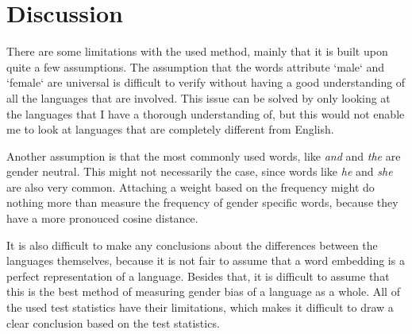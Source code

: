 \section{Discussion}
%
There are some limitations with the used method, mainly that it is built upon quite a few
assumptions.
The assumption that the words attribute `male` and `female` are universal is difficult
to verify without having a good understanding of all the languages that are involved.
This issue can be solved by only looking at the languages that I have a thorough
understanding of, but this would not enable me to look at languages that are completely
different from English.

Another assumption is that the most commonly used words, like \textit{and} and \textit{the}
are gender neutral. This might not necessarily the case, since words like \textit{he} and
\textit{she} are also very common. Attaching a weight based on the frequency might do
nothing more than measure the frequency of gender specific words, because they have a
more pronouced cosine distance.

It is also difficult to make any conclusions about the differences between the languages
themselves, because it is not fair to assume that a word embedding is a perfect
representation of a language. Besides that, it is difficult to assume that this is
the best method of measuring gender bias of a language as a whole. All of the used
test statistics have their limitations, which makes it difficult to draw a clear
conclusion based on the test statistics.
